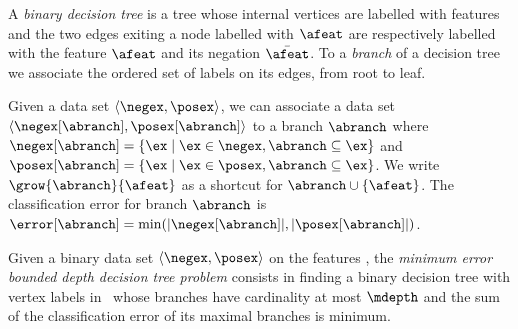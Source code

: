 \documentclass{article}
\begin{document}
A \emph{binary decision tree} is a tree whose 
internal vertices are labelled with features and the two edges exiting a node labelled with $\afeat$ are respectively labelled with the feature $\afeat$ and its negation $\bar{\afeat}$.
To a \emph{branch} of a decision tree we associate the ordered set of labels on its edges, from root to leaf.



 
Given a data set $\langle \negex,\posex \rangle$, we can associate a data set $\langle \negex[\abranch],\posex[\abranch] \rangle$ to a branch $\abranch$ where $\negex[\abranch] = \{\ex \mid \ex \in \negex, \abranch \subseteq \ex\}$ and $\posex[\abranch] = \{\ex \mid \ex \in \posex, \abranch \subseteq \ex\}$.
%
%
We write $\grow{\abranch}{\afeat}$ as a shortcut for $\abranch \cup \{\afeat\}$.
The classification error for branch $\abranch$ is $\error[\abranch]=\min(|\negex[\abranch]|, |\posex[\abranch]|)$.


Given a binary data set $\langle \negex,\posex \rangle$ on the features \features, %
the \emph{minimum error bounded depth decision tree problem} consists in finding a binary decision tree with vertex labels in \features\ whose branches have cardinality at most $\mdepth$ and the sum of the classification error %
of its maximal branches is minimum.
\end{document}

